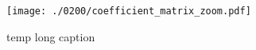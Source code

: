 \begin{figure}[h]
    \begin{adjustbox}{center}
        \texttt{[image: ./0200/coefficient\_matrix\_zoom.pdf]}
    \end{adjustbox}
    \caption[temp short caption]{temp long caption}
    \label{suppl:fig:L_coefficients_zoom}
\end{figure}



